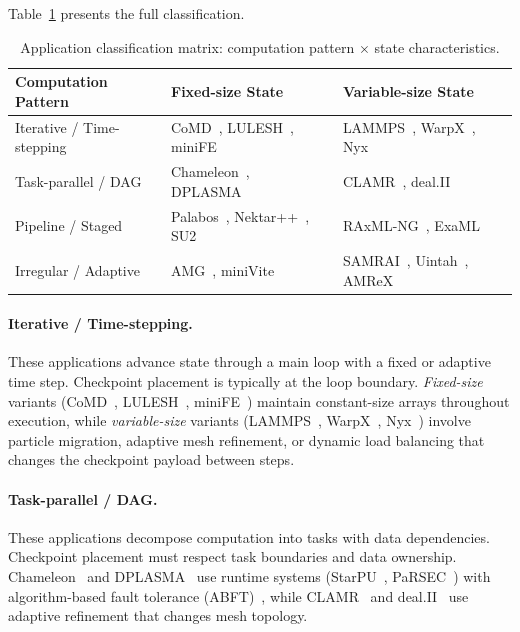 Table~\ref{tab:classification} presents the full classification.

\begin{table}[t]
\centering
\caption{Application classification matrix: computation pattern $\times$ state characteristics.}
\label{tab:classification}
\small
\begin{tabular}{@{}lll@{}}
\toprule
\textbf{Computation Pattern} & \textbf{Fixed-size State} & \textbf{Variable-size State} \\
\midrule
Iterative / Time-stepping & CoMD~\cite{comd}, LULESH~\cite{lulesh}, miniFE~\cite{minife} & LAMMPS~\cite{lammps}, WarpX~\cite{warpx}, Nyx~\cite{nyx} \\
Task-parallel / DAG       & Chameleon~\cite{chameleon}, DPLASMA~\cite{dplasma}   & CLAMR~\cite{clamr}, deal.II~\cite{dealii} \\
Pipeline / Staged          & Palabos~\cite{palabos}, Nektar++~\cite{nektar}, SU2~\cite{su2} & RAxML-NG~\cite{raxml-ng}, ExaML~\cite{examl} \\
Irregular / Adaptive       & AMG~\cite{amg}, miniVite~\cite{minivite}        & SAMRAI~\cite{samrai}, Uintah~\cite{uintah}, AMReX~\cite{amrex} \\
\bottomrule
\end{tabular}
\end{table}

\paragraph{Iterative / Time-stepping.}
These applications advance state through a main loop with a fixed or adaptive time step. Checkpoint placement is typically at the loop boundary. \emph{Fixed-size} variants (CoMD~\cite{comd}, LULESH~\cite{lulesh}, miniFE~\cite{minife}) maintain constant-size arrays throughout execution, while \emph{variable-size} variants (LAMMPS~\cite{lammps}, WarpX~\cite{warpx}, Nyx~\cite{nyx}) involve particle migration, adaptive mesh refinement, or dynamic load balancing that changes the checkpoint payload between steps.

\paragraph{Task-parallel / DAG.}
These applications decompose computation into tasks with data dependencies. Checkpoint placement must respect task boundaries and data ownership. Chameleon~\cite{chameleon} and DPLASMA~\cite{dplasma} use runtime systems (StarPU~\cite{starpu}, PaRSEC~\cite{parsec}) with algorithm-based fault tolerance (ABFT)~\cite{abft}, while CLAMR~\cite{clamr} and deal.II~\cite{dealii} use adaptive refinement that changes mesh topology.

